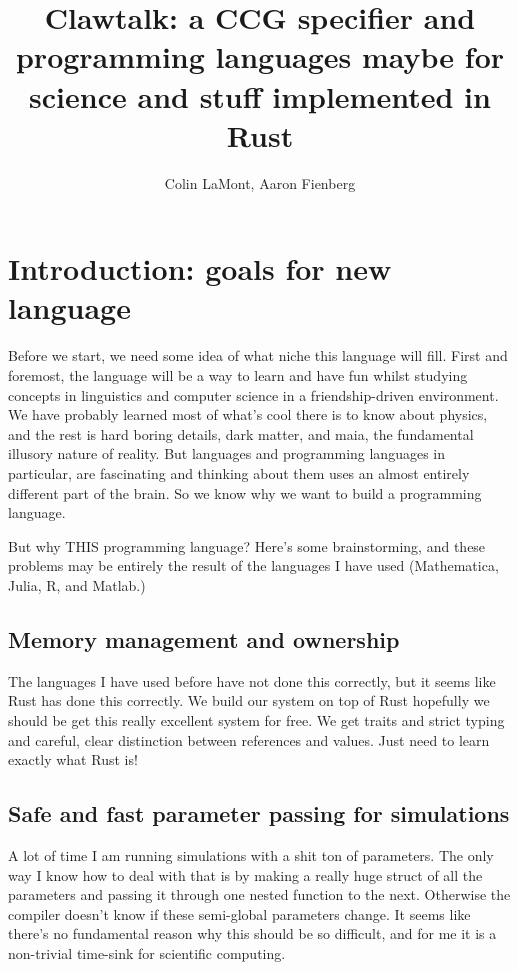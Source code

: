 \documentclass[onecolumn,10pt]{article}
\title{Clawtalk: a CCG specifier and programming languages maybe for science and stuff implemented in Rust}
\author{Colin LaMont, Aaron Fienberg}
\begin{document}
\maketitle

\section{Introduction: goals for new language}
Before we start, we need some idea of what niche this language will fill.
First and foremost, the language will be a way to learn and have fun whilst studying concepts in linguistics and computer science in a friendship-driven environment. 
We have probably learned most of what's cool there is to know about physics, and the rest is hard boring details, dark matter, and maia, the fundamental illusory nature of reality.
But languages and programming languages in particular, are fascinating and thinking about them uses an almost entirely different part of the brain.
So we know why we want to build a programming language.

But why THIS programming language? Here's some brainstorming, and these problems may be entirely the result of the languages I have used (Mathematica, Julia, R, and Matlab.)

\subsection{Memory management and ownership}
The languages I have used before have not done this correctly, but it seems like Rust has done this correctly. We build our system on top of Rust hopefully we should be get this really excellent system for free. We get traits and strict typing and careful, clear distinction between references and values. Just need to learn exactly what Rust is!

\subsection{Safe and fast parameter passing for simulations}
A lot of time I am running simulations with a shit ton of parameters.
The only way I know how to deal with that is by making a really huge struct of all the parameters and passing it through one nested function to the next.
Otherwise the compiler doesn't know if these semi-global parameters change.
It seems like there's no fundamental reason why this should be so difficult, and for me it is a non-trivial time-sink for scientific computing.
\end{document}
